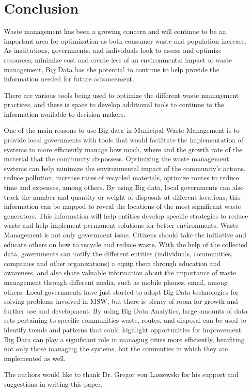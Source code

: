\documentclass[sigconf]{acmart}
\begin{document}
\section{Conclusion}
Waste management has been a growing concern and will continue to be an important area for optimization as both consumer waste and population increase.  As institutions, governments, and individuals look to assess and optimize resources, minimize cost and create less of an environmental impact of waste management, Big Data has the potential to continue to help provide the information needed for future advancement.

There are various tools being used to optimize the different waste management practices, and there is space to develop additional tools to continue to the information available to decision makers.

One of the main reasons to use Big data in Municipal Waste Management is to provide local governments with tools that would facilitate the implementation of systems to more efficiently manage how much, where and the growth rate of the material that the community dispossess. Optimizing the waste management systems can help minimize the environmental impact of the community's actions, reduce pollution, increase rates of recycled materials, optimize routes to reduce time and expenses, among others.
By using Big data, local governments can also track the number and quantity or weight of disposals at different locations; this information can be mapped to reveal the locations of the most significant waste generators.  This information will help entities develop specific strategies to reduce waste and help implement permanent solutions for better environments. 
Waste Management is not only government issue. Citizens should take the initiative and educate others on how to recycle and reduce waste. With the help of the collected data, governments can notify the different entities (individuals, communities, companies and other organizations) a equip them through education and awareness, and also share valuable information about the importance of waste management through different media, such as mobile phones, email, among others.
Local governments have just started to adopt Big Data technologies for solving problems involved in MSW, but there is plenty of room for growth and further use and development.  By using Big Data Analytics, large amounts of data sets pertaining to specific communities waste, routes, and disposal can be used to identify trends and patterns that could highlight opportunities for improvement. Big Data can play a significant role in managing cities more efficiently, benifiting not only those managing the systems, but the commuties in which they are implemented as well.
\begin{acks}

The authors would like to thank Dr. Gregor von Laszewski for his support and suggestions in writing this paper.

\end{acks}

 


\end{document}
